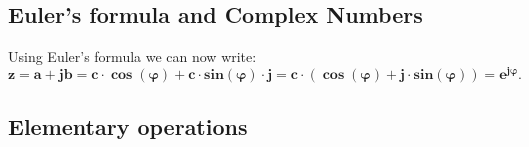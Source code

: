 \documentclass[12pt,oneside,openany]{memoir}
\numberwithin{equation}{subsection}
\begin{document}
\subsection{Euler's formula and Complex Numbers}
Using Euler's formula we can now write:
\[
	\boldsymbol{z = a + jb = c \cdot \cos(\varphi) + c \cdot sin(\varphi)
	\cdot j = c \cdot (\cos(\varphi) + j \cdot sin(\varphi)) =
	e^{j \varphi}}.
\]


\subsection{Elementary operations}
\end{document}
